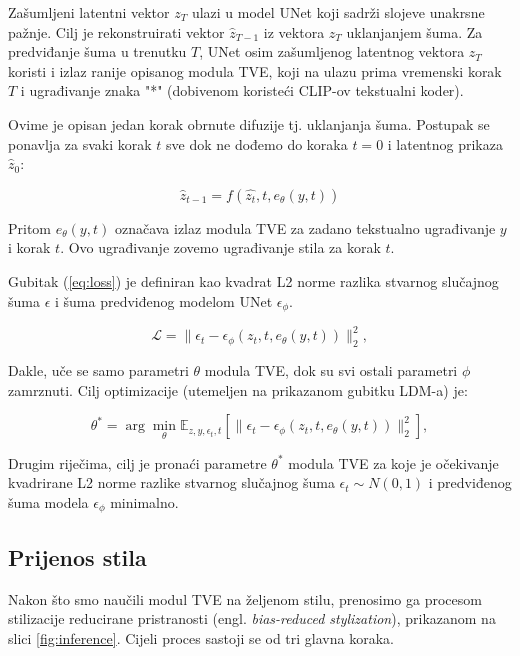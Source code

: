Zašumljeni latentni vektor $z_T$ ulazi u model UNet koji sadrži slojeve unakrsne pažnje. Cilj je rekonstruirati vektor $\hat{z}_{T-1}$ iz vektora $z_T$ uklanjanjem šuma. Za predviđanje šuma u trenutku $T$, UNet osim zašumljenog latentnog vektora $z_T$ koristi i izlaz ranije opisanog modula TVE, koji na ulazu prima vremenski korak $T$ i ugrađivanje znaka "*" (dobivenom koristeći CLIP-ov tekstualni koder). 
  
Ovime je opisan jedan korak obrnute difuzije tj. uklanjanja šuma. Postupak se ponavlja za svaki korak $t$ sve dok ne dođemo do koraka $t = 0$ i latentnog prikaza $\hat{z}_0$:

\begin{equation}
    \hat{z}_{t-1} = f(\hat{z_t}, t, e_\theta(y, t))
\end{equation}

Pritom $e_\theta(y, t)$ označava izlaz modula TVE za zadano tekstualno ugrađivanje $y$ i korak $t$. Ovo ugrađivanje zovemo ugrađivanje stila za korak $t$.

Gubitak (\ref{eq:loss}) je definiran kao kvadrat L2 norme razlika stvarnog slučajnog šuma $\epsilon$ i šuma predviđenog modelom UNet $\epsilon_\phi$. 

\begin{equation}
    \mathcal{L} = \| \epsilon_t - \epsilon_\phi(z_t, t, e_\theta(y, t)) \|_2^2 ,
    \label{eq:loss}
\end{equation}

Dakle, uče se samo parametri $\theta$ modula TVE, dok su svi ostali parametri $\phi$ zamrznuti. Cilj optimizacije (utemeljen na prikazanom gubitku LDM-a) je:

\begin{equation}
    \theta^{*} = \arg\min_{\theta} \mathbb{E}_{z, y, \epsilon_t, t} \left[ \| \epsilon_t - \epsilon_\phi(z_t, t, e_\theta(y, t)) \|_2^2 \right],
\end{equation}

Drugim riječima, cilj je pronaći parametre $\theta^{*}$ modula TVE za koje je očekivanje kvadrirane L2 norme razlike stvarnog slučajnog šuma $\epsilon_t \sim N(0, 1)$ i predviđenog šuma modela $\epsilon_{\phi}$ minimalno.


\subsection{Prijenos stila}
Nakon što smo naučili modul TVE na željenom stilu, prenosimo ga procesom stilizacije reducirane pristranosti (engl. \textit{bias-reduced stylization}), prikazanom na slici \ref{fig:inference}. Cijeli proces sastoji se od tri glavna koraka.

